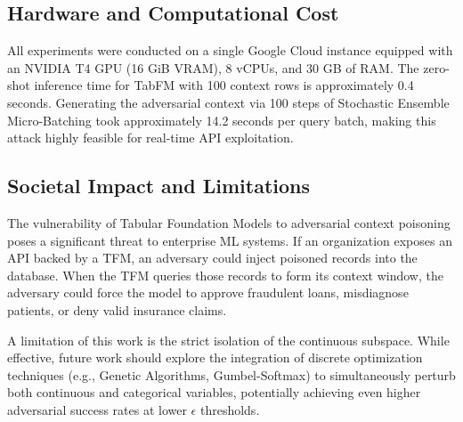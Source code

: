 \subsection{Hardware and Computational Cost}
All experiments were conducted on a single Google Cloud instance equipped with an NVIDIA T4 GPU (16 GiB VRAM), 8 vCPUs, and 30 GB of RAM. The zero-shot inference time for TabFM with 100 context rows is approximately 0.4 seconds. Generating the adversarial context via 100 steps of Stochastic Ensemble Micro-Batching took approximately 14.2 seconds per query batch, making this attack highly feasible for real-time API exploitation.

\subsection{Societal Impact and Limitations}
The vulnerability of Tabular Foundation Models to adversarial context poisoning poses a significant threat to enterprise ML systems. If an organization exposes an API backed by a TFM, an adversary could inject poisoned records into the database. When the TFM queries those records to form its context window, the adversary could force the model to approve fraudulent loans, misdiagnose patients, or deny valid insurance claims. 

A limitation of this work is the strict isolation of the continuous subspace. While effective, future work should explore the integration of discrete optimization techniques (e.g., Genetic Algorithms, Gumbel-Softmax) to simultaneously perturb both continuous and categorical variables, potentially achieving even higher adversarial success rates at lower $\epsilon$ thresholds.
